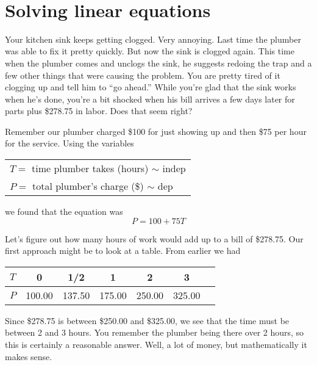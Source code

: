  ~\vspace{.1in}
 
\section{Solving linear equations }

Your kitchen sink keeps getting clogged.  Very annoying. Last time  the plumber was able to fix it pretty quickly.  But now the sink is clogged again.  This time when the plumber comes and unclogs the sink, he suggests redoing the trap and a few other things that were causing the problem.  You are pretty tired of it clogging up and tell him to ``go ahead.'' While you're glad that the sink works when he's done, you're a bit shocked when his bill arrives a few days later for parts plus \$278.75 in labor. Does that seem right?

Remember our plumber charged \$100 for just showing up and then \$75 per hour for the service.  Using the variables  
\begin{center}
\begin{tabular} {l} 
$T=$ time plumber takes (hours) $\sim$ indep \\
$P= $ total plumber's charge (\$) $\sim$ dep \\ 
\end{tabular}
\end{center}
we found that the equation was $$P=100+75T$$  

Let's figure out how many hours of work would add up to a bill of \$278.75.  Our first approach might be to look at a table.  From earlier we had

\begin{center}
\begin{tabular} {|l| |c |c |c |c |c |c  |} \hline
$T$ & 0 & 1/2 & 1 & 2 & 3 \\ \hline
$P$ & 100.00 & 137.50 & 175.00 & 250.00 & 325.00 \\ \hline
\end{tabular}
\end{center}

\noindent Since \$278.75 is between \$250.00 and \$325.00, we see that the time must be between 2 and 3 hours. You remember the plumber being there over 2 hours, so this is certainly a reasonable answer.  Well, a lot of money, but mathematically it makes sense.

